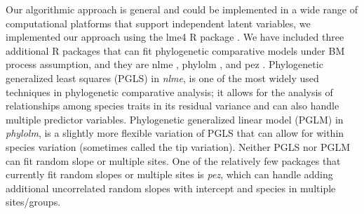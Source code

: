 Our algorithmic approach is general and could be implemented in a wide range of computational platforms that support independent latent variables, we implemented our approach using the lme4 R package \citep{bates2015fitting}.
We have included three additional R packages that can fit phylogenetic comparative models under BM process assumption, and they are nlme \citep{pinheiro2014r}, phylolm \citep{ho2014phylolm}, and pez \citep{pearse2015pez}.
Phylogenetic generalized least squares (PGLS) in \textit{nlme}, is one of the most widely used techniques in phylogenetic comparative analysis; it allows for the analysis of relationships among species traits in its residual variance and can also handle multiple predictor variables.
Phylogenetic generalized linear model (PGLM) in \textit{phylolm}, is a slightly more flexible variation of PGLS that can allow for within species variation (sometimes called the tip variation). 
Neither PGLS nor PGLM can fit random slope or multiple sites. 
One of the relatively few packages that currently fit random slopes or multiple sites is \textit{pez}, which can handle adding additional uncorrelated random slopes with intercept and species in multiple sites/groups.  



% 
% 

